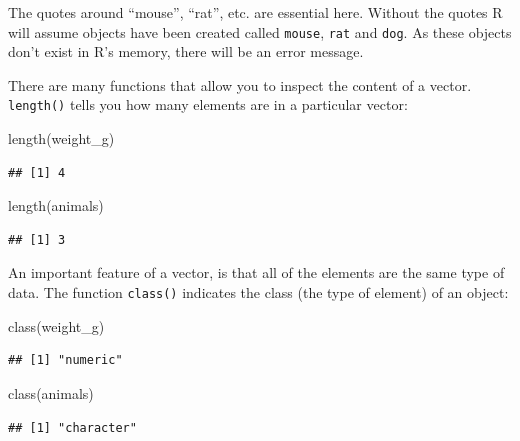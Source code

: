 \documentclass[
]{book}
\newenvironment{Shaded}{\begin{snugshade}}{\end{snugshade}}
\newcommand{\FunctionTok}[1]{\textcolor[rgb]{0.00,0.00,0.00}{#1}}
\newcommand{\NormalTok}[1]{#1}
\begin{document}
The quotes around ``mouse'', ``rat'', etc. are essential here. Without the quotes R will assume objects have been created called \texttt{mouse}, \texttt{rat} and \texttt{dog}. As these objects don't exist in R's memory, there will be an error message.

There are many functions that allow you to inspect the content of a vector. \texttt{length()} tells you how many elements are in a particular vector:

\begin{Shaded}
\begin{Highlighting}[]
\FunctionTok{length}\NormalTok{(weight\_g)}
\end{Highlighting}
\end{Shaded}

\begin{verbatim}
## [1] 4
\end{verbatim}

\begin{Shaded}
\begin{Highlighting}[]
\FunctionTok{length}\NormalTok{(animals)}
\end{Highlighting}
\end{Shaded}

\begin{verbatim}
## [1] 3
\end{verbatim}

An important feature of a vector, is that all of the elements are the same type of data. The function \texttt{class()} indicates the class (the type of element) of an object:

\begin{Shaded}
\begin{Highlighting}[]
\FunctionTok{class}\NormalTok{(weight\_g)}
\end{Highlighting}
\end{Shaded}

\begin{verbatim}
## [1] "numeric"
\end{verbatim}

\begin{Shaded}
\begin{Highlighting}[]
\FunctionTok{class}\NormalTok{(animals)}
\end{Highlighting}
\end{Shaded}

\begin{verbatim}
## [1] "character"
\end{verbatim}
\end{document}

